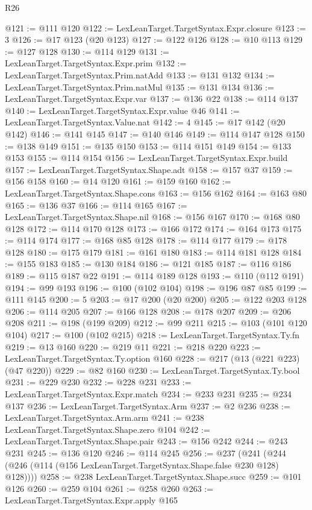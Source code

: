 \begin{lexlean}{R26}
\begin{coremodule}
@121 := @111 @120
@122 := LexLeanTarget.TargetSyntax.Expr.closure
@123 := 3
@126 := @17 @123 (@20 @123)
@127 := @122 @126
@128 := @10 @113
@129 := @127 @128
@130 := @114 @129
@131 := LexLeanTarget.TargetSyntax.Expr.prim
@132 := LexLeanTarget.TargetSyntax.Prim.natAdd
@133 := @131 @132
@134 := LexLeanTarget.TargetSyntax.Prim.natMul
@135 := @131 @134
@136 := LexLeanTarget.TargetSyntax.Expr.var
@137 := @136 @22
@138 := @114 @137
@140 := LexLeanTarget.TargetSyntax.Expr.value @46
@141 := LexLeanTarget.TargetSyntax.Value.nat
@142 := 4
@145 := @17 @142 (@20 @142)
@146 := @141 @145
@147 := @140 @146
@149 := @114 @147 @128
@150 := @138 @149
@151 := @135 @150
@153 := @114 @151 @149
@154 := @133 @153
@155 := @114 @154
@156 := LexLeanTarget.TargetSyntax.Expr.build
@157 := LexLeanTarget.TargetSyntax.Shape.adt
@158 := @157 @37
@159 := @156 @158
@160 := @14 @120
@161 := @159 @160
@162 := LexLeanTarget.TargetSyntax.Shape.cons
@163 := @156 @162
@164 := @163 @80
@165 := @136 @37
@166 := @114 @165
@167 := LexLeanTarget.TargetSyntax.Shape.nil
@168 := @156 @167
@170 := @168 @80 @128
@172 := @114 @170 @128
@173 := @166 @172
@174 := @164 @173
@175 := @114 @174
@177 := @168 @85 @128
@178 := @114 @177
@179 := @178 @128
@180 := @175 @179
@181 := @161 @180
@183 := @114 @181 @128
@184 := @155 @183
@185 := @130 @184
@186 := @121 @185
@187 := @116 @186
@189 := @115 @187 @22
@191 := @114 @189 @128
@193 := @110 (@112 @191)
@194 := @99 @193
@196 := @100 (@102 @104)
@198 := @196 @87 @85
@199 := @111 @145
@200 := 5
@203 := @17 @200 (@20 @200)
@205 := @122 @203 @128
@206 := @114 @205
@207 := @166 @128
@208 := @178 @207
@209 := @206 @208
@211 := @198 (@199 @209)
@212 := @99 @211
@215 := @103 (@101 @120 @104)
@217 := @100 (@102 @215)
@218 := LexLeanTarget.TargetSyntax.Ty.fn
@219 := @13 @160
@220 := @219 @11
@221 := @218 @220
@223 := LexLeanTarget.TargetSyntax.Ty.option @160
@228 := @217 (@13 (@221 @223) (@47 @220))
@229 := @82 @160
@230 := LexLeanTarget.TargetSyntax.Ty.bool
@231 := @229 @230
@232 := @228 @231
@233 := LexLeanTarget.TargetSyntax.Expr.match
@234 := @233 @231
@235 := @234 @137
@236 := LexLeanTarget.TargetSyntax.Arm
@237 := @2 @236
@238 := LexLeanTarget.TargetSyntax.Arm.arm
@241 := @238 LexLeanTarget.TargetSyntax.Shape.zero @104
@242 := LexLeanTarget.TargetSyntax.Shape.pair
@243 := @156 @242
@244 := @243 @231
@245 := @136 @120
@246 := @114 @245
@256 := @237
    (@241 (@244 (@246 (@114 (@156 LexLeanTarget.TargetSyntax.Shape.false @230 @128) @128))))
@258 := @238 LexLeanTarget.TargetSyntax.Shape.succ
@259 := @101 @126
@260 := @259 @104
@261 := @258 @260
@263 := LexLeanTarget.TargetSyntax.Expr.apply @165

\end{coremodule}
\end{lexlean}
